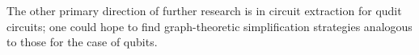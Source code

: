The other primary direction of further research is in circuit extraction \cite{backens2020again} for qudit circuits; one could hope to find graph-theoretic simplification \cite{graph_theoretic_simplification} strategies analogous to those for the case of qubits.

